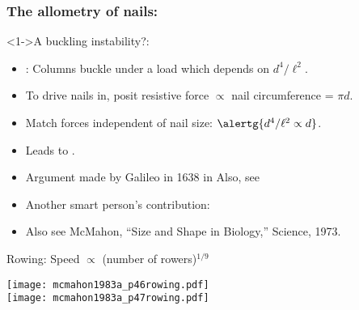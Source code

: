 \begin{frame}
  \frametitle{The allometry of nails:}

  \begin{block}<1->{A buckling instability?:}
    \begin{itemize}
    \item<2-> 
      : 
      Columns buckle under a load which depends on $d^4/\ell^2$.
    \item<3->
      To drive nails in, posit resistive force $\propto$ nail circumference = $\pi d$.
    \item<4->
      Match forces independent of nail size: $\alertg{d^4/\ell^2 \propto d}$.
    \item<5->
      Leads to .
    \item<6->
      Argument made by Galileo\cite{galilei1638a} in 1638 in
      Also, see 
    \item<7->
      Another smart person's contribution: 
    \item<8->
      Also see McMahon, ``Size and Shape in Biology,'' Science, 1973.\cite{mcmahon1973a}
    \end{itemize}
  \end{block}

\end{frame}



\begin{frame}

  \begin{block}{Rowing: Speed $\propto $ (number of rowers)$^{1/9}$}
    \begin{center}
      \texttt{[image: mcmahon1983a\_p46rowing.pdf]} \\
      \texttt{[image: mcmahon1983a\_p47rowing.pdf]}
    \end{center}
  \end{block}

\end{frame}


